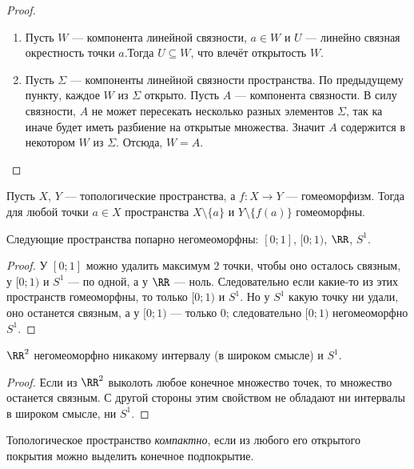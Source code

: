 \documentclass[12pt,a4paper]{article}
\begin{document}
    \begin{proof}
        \begin{enumerate}
            \item Пусть $W$ --- компонента линейной связности, $a \in W$ и $U$ --- линейно связная окрестность точки $a$.Тогда $U \subseteq W$, что влечёт открытость $W$.
            \item Пусть $\Sigma$ --- компоненты линейной связности пространства. По предыдущему пункту, каждое $W$ из $\Sigma$ открыто. Пусть $A$ --- компонента связности. В силу связности, $A$ не может пересекать несколько разных элементов $\Sigma$, так ка иначе будет иметь разбиение на открытые множества. Значит $A$ содержится в некотором $W$ из $\Sigma$. Отсюда, $W = A$.
        \end{enumerate}
    \end{proof}

    \begin{lemma}
        Пусть $X$, $Y$ --- топологические пространства, а $f: X \to Y$ --- гомеоморфизм. Тогда для любой точки $a \in X$ пространства $X \setminus \{a\}$ и $Y \setminus \{f(a)\}$ гомеоморфны.
    \end{lemma}

    \begin{theorem}
        Следующие пространства попарно негомеоморфны: $[0; 1]$, $[0; 1)$, $\RR$, $S^1$.
    \end{theorem}

    \begin{proof}
        У $[0; 1]$ можно удалить максимум 2 точки, чтобы оно осталось связным, у $[0; 1)$ и $S^1$ --- по одной, а у $\RR$ --- ноль. Следовательно если какие-то из этих пространств гомеоморфны, то только $[0; 1)$ и $S^1$. Но у $S^1$ какую точку ни удали, оно останется связным, а у $[0; 1)$ --- только $0$; следовательно $[0; 1)$ негомеоморфно $S^1$.
    \end{proof}

    \begin{theorem}
        $\RR^2$ негомеоморфно никакому интервалу (в широком смысле) и $S^1$.
    \end{theorem}

    \begin{proof}
        Если из $\RR^2$ выколоть любое конечное множество точек, то множество останется связным. С другой стороны этим свойством не обладают ни интервалы в широком смысле, ни $S^1$.
    \end{proof}

    \begin{definition}
        Топологическое пространство \emph{компактно}, если из любого его открытого покрытия можно выделить конечное подпокрытие.
    \end{definition}
\end{document}
